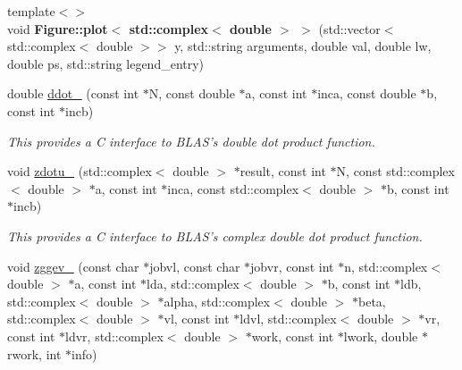 \begin{DoxyCompactItemize}
\item 
\hypertarget{namespacekeycpp_acfb9f560ec3a131190f23bf18c12b2f8}{{\footnotesize template$<$$>$ }\\void {\bfseries Figure\-::plot$<$ std\-::complex$<$ double $>$ $>$} (std\-::vector$<$ std\-::complex$<$ double $>$$>$ y, std\-::string arguments, double val, double lw, double ps, std\-::string legend\-\_\-entry)}\label{namespacekeycpp_acfb9f560ec3a131190f23bf18c12b2f8}

\item 
\hypertarget{namespacekeycpp_a55e50932cc54f92bdd7e38c6438f4f1f}{double \hyperlink{namespacekeycpp_a55e50932cc54f92bdd7e38c6438f4f1f}{ddot\-\_\-} (const int $\ast$N, const double $\ast$a, const int $\ast$inca, const double $\ast$b, const int $\ast$incb)}\label{namespacekeycpp_a55e50932cc54f92bdd7e38c6438f4f1f}

\begin{DoxyCompactList}\small\item\em This provides a C interface to B\-L\-A\-S's double dot product function. \end{DoxyCompactList}\item 
\hypertarget{namespacekeycpp_a2ce99b4fe4a13b9c70ada81761eb0ca2}{void \hyperlink{namespacekeycpp_a2ce99b4fe4a13b9c70ada81761eb0ca2}{zdotu\-\_\-} (std\-::complex$<$ double $>$ $\ast$result, const int $\ast$N, const std\-::complex$<$ double $>$ $\ast$a, const int $\ast$inca, const std\-::complex$<$ double $>$ $\ast$b, const int $\ast$incb)}\label{namespacekeycpp_a2ce99b4fe4a13b9c70ada81761eb0ca2}

\begin{DoxyCompactList}\small\item\em This provides a C interface to B\-L\-A\-S's complex double dot product function. \end{DoxyCompactList}\item 
\hypertarget{namespacekeycpp_ace2501951ab3db3a91c3520ae89750b1}{void \hyperlink{namespacekeycpp_ace2501951ab3db3a91c3520ae89750b1}{zggev\-\_\-} (const char $\ast$jobvl, const char $\ast$jobvr, const int $\ast$n, std\-::complex$<$ double $>$ $\ast$a, const int $\ast$lda, std\-::complex$<$ double $>$ $\ast$b, const int $\ast$ldb, std\-::complex$<$ double $>$ $\ast$alpha, std\-::complex$<$ double $>$ $\ast$beta, std\-::complex$<$ double $>$ $\ast$vl, const int $\ast$ldvl, std\-::complex$<$ double $>$ $\ast$vr, const int $\ast$ldvr, std\-::complex$<$ double $>$ $\ast$work, const int $\ast$lwork, double $\ast$rwork, int $\ast$info)}\label{namespacekeycpp_ace2501951ab3db3a91c3520ae89750b1}


\end{DoxyCompactItemize}

